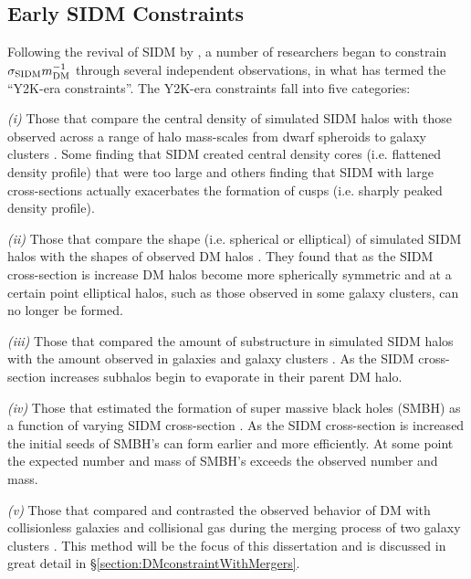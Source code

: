 \subsection{Early SIDM Constraints}\label{section:EarlySIDMconstraints}

Following the revival of SIDM by \citet{Spergel:2000cb}, a number of researchers began to constrain $\sigma_{\rm SIDM}m_{\rm DM}^{-1}$ through several independent observations, in what \citet{Peter:2012vi} has termed the ``Y2K-era constraints''.
The Y2K-era constraints fall into five categories:

\textit{(i)} Those that compare the central density of simulated SIDM halos with those observed across a range of halo mass-scales from dwarf spheroids to galaxy clusters \citep{Hogan:2000ih, Kochanek:2000iw, Yoshida:2000bd, Yoshida:2000gn, Dave:2001hh, Dalcanton:2001jj, Meneghetti:2001en, Colin:2002ku}.
Some finding that SIDM created central density cores (i.e. flattened density profile) that were too large and others finding that SIDM with large cross-sections actually exacerbates the formation of cusps (i.e. sharply peaked density profile).

\textit{(ii)} Those that compare the shape (i.e. spherical or elliptical) of simulated SIDM halos with the shapes of observed DM halos \citep{Yoshida:2000bd, Dave:2001hh, MiraldaEscude:2002ev}.
They found that as the SIDM cross-section is increase DM halos become more spherically symmetric and at a certain point elliptical halos, such as those observed in some galaxy clusters, can no longer be formed.

\textit{(iii)} Those that compared the amount of substructure in simulated SIDM halos with the amount observed in galaxies and galaxy clusters \citep{Hogan:2000ih, Yoshida:2000bd, Gnedin:2001gd, Colin:2002ku}.
As the SIDM cross-section increases subhalos begin to evaporate in their parent DM halo.

\textit{(iv)} Those that estimated the formation of super massive black holes (SMBH) as a function of varying SIDM cross-section \citep{Hennawi:2002kv}.
As the SIDM cross-section is increased the initial seeds of SMBH's can form earlier and more efficiently. 
At some point the expected number and mass of SMBH's exceeds the observed number and mass.

\textit{(v)} Those that compared and contrasted the observed behavior of DM with collisionless galaxies and collisional gas during the merging process of two galaxy clusters \citep{Markevitch:2004dl}.
This method will be the focus of this dissertation and is discussed in great detail in \S\ref{section:DMconstraintWithMergers}.

